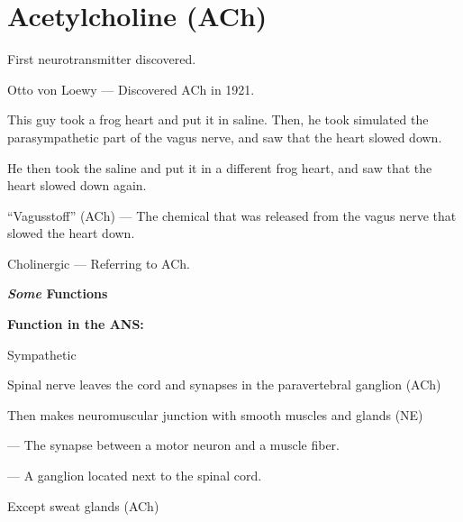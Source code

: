 \section{Acetylcholine (ACh)}

\begin{coloredlist}
    \item First neurotransmitter discovered.
    \begin{coloredlist}
        \item Otto von Loewy — Discovered ACh in 1921.
        \begin{coloredlist}
            \item This guy took a frog heart and put it in saline. Then, he took simulated the parasympathetic part of the vagus nerve, and saw that the heart slowed down.
            \item He then took the saline and put it in a different frog heart, and saw that the heart slowed down again.
            \item ``Vagusstoff'' (ACh) — The chemical that was released from the vagus nerve that slowed the heart down.
            \item Cholinergic — Referring to ACh.
        \end{coloredlist}
    \end{coloredlist}
    \item \textbf{\textit{Some} Functions}
    \begin{coloredlist}
        \item \textbf{Function in the ANS:}
        \begin{coloredlist}
            \item Sympathetic
            \begin{coloredlist}
                \item Spinal nerve leaves the cord and synapses in the paravertebral ganglion (ACh)
                \item Then makes neuromuscular junction with smooth muscles and glands (NE)
                \begin{coloredlist}
                    \item {} — The synapse between a motor neuron and a muscle fiber.
                    \item {} — A ganglion located next to the spinal cord.
                \end{coloredlist}
                \begin{coloredlist}
                    \item Except sweat glands (ACh)

\end{coloredlist}
\end{coloredlist}
\end{coloredlist}
\end{coloredlist}
\end{coloredlist}
